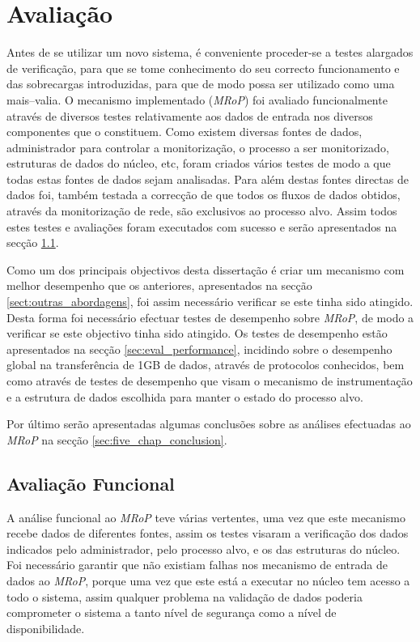 \chapter{Avaliação}
\label{cap:avaliacao}

Antes de se utilizar um novo sistema, é conveniente proceder-se a testes alargados de verificação, para que se tome conhecimento do seu correcto funcionamento e das sobrecargas introduzidas, para que de modo possa ser utilizado como uma mais–valia.
O mecanismo implementado (\textit{MRoP}) foi avaliado funcionalmente através de diversos testes relativamente aos dados de entrada nos diversos componentes que o constituem.
Como existem diversas fontes de dados, administrador para controlar a monitorização, o processo a ser monitorizado, estruturas de dados do núcleo, etc, foram criados vários testes de modo a que todas estas fontes de dados sejam analisadas.
Para além destas fontes directas de dados foi, também testada a correcção de que todos os fluxos de dados obtidos, através da monitorização de rede, são exclusivos ao processo alvo.
Assim todos estes testes e avaliações foram executados com sucesso e serão apresentados na secção \ref{sec:eval_functional}.

Como um dos principais objectivos desta dissertação é criar um mecanismo com melhor desempenho que os anteriores, apresentados na secção \ref{sect:outras_abordagens}, foi assim necessário verificar se este tinha sido atingido.
Desta forma foi necessário efectuar testes de desempenho sobre \textit{MRoP}, de modo a verificar se este objectivo tinha sido atingido.
Os testes de desempenho estão apresentados na secção \ref{sec:eval_performance}, incidindo sobre o desempenho global na transferência de 1GB de dados, através de protocolos conhecidos, bem como através de testes de desempenho que visam o mecanismo de instrumentação e a estrutura de dados escolhida para manter o estado do processo alvo.

Por último serão apresentadas algumas conclusões sobre as análises efectuadas ao \textit{MRoP} na secção \ref{sec:five_chap_conclusion}.

\section{Avaliação Funcional}
\label{sec:eval_functional}

A análise funcional ao \textit{MRoP} teve várias vertentes, uma vez que este mecanismo recebe dados de diferentes fontes, assim os testes visaram a verificação dos dados indicados pelo administrador, pelo processo alvo, e os das estruturas do núcleo.
Foi necessário garantir que não existiam falhas nos mecanismo de entrada de dados ao \textit{MRoP}, porque uma vez que este está a executar no núcleo tem acesso a todo o sistema, assim qualquer problema na validação de dados poderia comprometer o sistema a tanto nível de segurança como a nível de disponibilidade.



